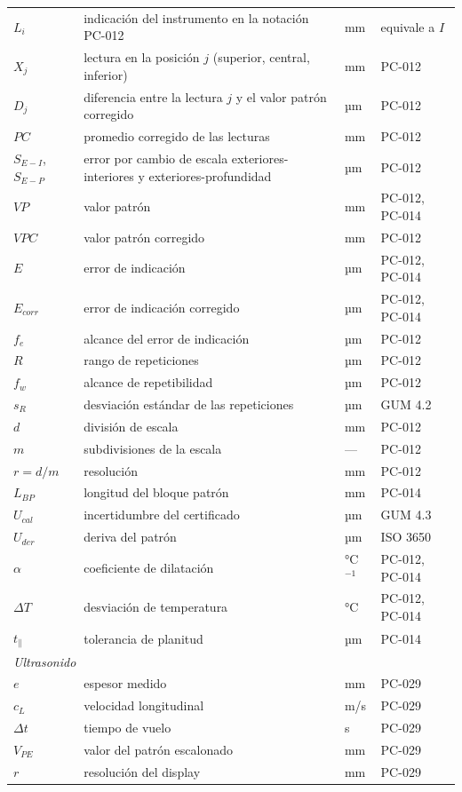 \begin{table}[H]
\begin{tabular}{@{}p{2.5cm}p{7.3cm}p{1.3cm}p{4.1cm}@{}}
$L_i$ & indicación del instrumento en la notación PC-012 & mm & equivale a $I$ \\
$X_j$ & lectura en la posición $j$ (superior, central, inferior) & mm & PC-012 \\
$D_j$ & diferencia entre la lectura $j$ y el valor patrón corregido & µm & PC-012 \\
$PC$ & promedio corregido de las lecturas & mm & PC-012 \\
$S_{E-I}$, $S_{E-P}$ & error por cambio de escala exteriores-interiores y exteriores-profundidad & µm & PC-012 \\
$VP$ & valor patrón & mm & PC-012, PC-014 \\
$VPC$ & valor patrón corregido & mm & PC-012 \\
$E$ & error de indicación & µm & PC-012, PC-014 \\
$E_{corr}$ & error de indicación corregido & µm & PC-012, PC-014 \\
$f_e$ & alcance del error de indicación & µm & PC-012 \\
$R$ & rango de repeticiones & µm & PC-012 \\
$f_w$ & alcance de repetibilidad & µm & PC-012 \\
$s_R$ & desviación estándar de las repeticiones & µm & GUM 4.2 \\
$d$ & división de escala & mm & PC-012 \\
$m$ & subdivisiones de la escala & --- & PC-012 \\
$r = d/m$ & resolución & mm & PC-012 \\
$L_{BP}$ & longitud del bloque patrón & mm & PC-014 \\
$U_{cal}$ & incertidumbre del certificado & µm & GUM 4.3 \\
$U_{der}$ & deriva del patrón & µm & ISO 3650 \\
$\alpha$ & coeficiente de dilatación & °C$^{-1}$ & PC-012, PC-014 \\
$\Delta T$ & desviación de temperatura & °C & PC-012, PC-014 \\
$t_\parallel$ & tolerancia de planitud & µm & PC-014 \\
\midrule
\multicolumn{4}{l}{\textit{Ultrasonido}} \\
$e$ & espesor medido & mm & PC-029 \\
$c_L$ & velocidad longitudinal & m/s & PC-029 \\
$\Delta t$ & tiempo de vuelo & s & PC-029 \\
$V_{PE}$ & valor del patrón escalonado & mm & PC-029 \\
$r$ & resolución del display & mm & PC-029 \\
\bottomrule
\end{tabular}
\end{table}
